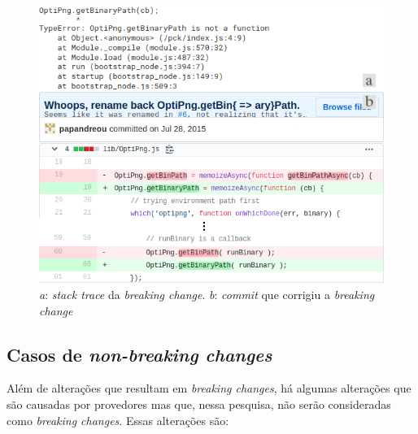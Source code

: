 \begin{figure}
    \centering
    \includegraphics[scale=0.65]{figuras/bc_optipng.png}
    \caption{\textit{a}: \textit{stack trace} da \textit{breaking change}. \textit{b}: \textit{commit} que corrigiu a \textit{breaking change}}
    \label{fig:bc_optipng}
\end{figure}{}

\subsection{Casos de \textit{non-breaking changes}}
Além de alterações que resultam em \textit{breaking changes}, há algumas alterações que são causadas por provedores mas que, nessa pesquisa, não serão consideradas como \textit{breaking changes}. Essas alterações são:

